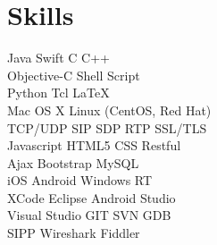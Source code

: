 \documentclass[a4paper]{lyu-resume} %
\begin{document}
\begin{minipage}[t]{0.33\textwidth} %


\section{Skills}

Java \textbullet{} Swift \textbullet{} C \textbullet{} C++\\
Objective-C \textbullet{} Shell Script \\
Python \textbullet{} Tcl \textbullet{} \LaTeX\\
Mac OS X \textbullet{} Linux (CentOS, Red Hat)\\
TCP/UDP \textbullet{} SIP \textbullet{} SDP \textbullet{} RTP \textbullet{} SSL/TLS\\
Javascript \textbullet{} HTML5 \textbullet{} CSS \textbullet{} Restful \\
Ajax \textbullet{} Bootstrap \textbullet{} MySQL \\ 
iOS \textbullet{} Android \textbullet{} Windows RT \\
XCode \textbullet{} Eclipse \textbullet{} Android Studio\\
Visual Studio \textbullet{} GIT \textbullet{} SVN \textbullet{} GDB\\
SIPP \textbullet{} Wireshark \textbullet{} Fiddler
\sectionspace %







\end{minipage}
\end{document}
